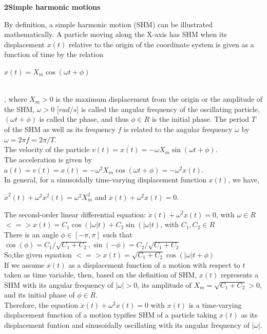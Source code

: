 \documentclass[a4paper,12pt,oneside]{report}
\newenvironment{tree}[4]{
\begin{list}{#1}{\parskip=0in \topsep=0in \itemsep=0in \parsep=0in \partopsep=0in \leftmargin=#2 \rightmargin=#3 \itemindent=#4 \listparindent=\itemindent}
}{\end{list}}
\newenvironment{ssection}[5]{
\phantom{#1}\textbf{#2\space#3}
\begin{tree}{#4}{0in}{0in}{#5}
}{\end{tree}}
\begin{document}
\begin{ssection}{\space}{2}{Simple harmonic motions}{\textbullet}{\parindent}
\item By definition, a simple harmonic motion (SHM) can be illustrated mathematically. A particle moving along the X-axis has SHM when its displacement $x(t)$ relative to the origin of the coordinate system is given as a function of time by the relation\\ \centerline{$x(t)=X_{m}\cos(\omega t+\phi)$}\\ \indent, where $X_{m}>0$ is the maximum displacement from the origin or the amplitude of the SHM, $\omega>0$ [$rad/s$] is called the angular frequency of the oscillating particle, $(\omega t+\phi)$ is called the phase, and thus $\phi\in R$ is the initial phase. The period $T$ of the SHM as well as its frequency $f$ is related to the angular frequency $\omega$ by $\omega=2\pi f=2\pi/T$.\\
\indent The velocity of the particle $v(t)=\dot{x(t)}=-\omega X_{m}\sin(\omega t+\phi)$.\\
\indent The acceleration is given by $a(t)=\dot{v(t)}=\ddot{x(t)}=-\omega^{2}X_{m}\cos(\omega t+\phi)=-\omega^{2}x(t)$. \\ \indent In general, for a sinusoidally time-varying displacement function $x(t)$, we have,\\ \centerline{$\dot{x}^{2}(t)+\omega^{2}x^{2}(t)=\omega^{2}X^{2}_{m}$ and $\ddot{x}(t)+\omega^{2}x(t)=0$.}
\item The second-order linear differential equation: $\ddot{x}(t)+\omega^{2}x(t)=0$, with $\omega\in R$\\ \indent $<=> x(t)=C_{1}\cos(|\omega|t)+C_{2}\sin(|\omega|t)$, with $C_{1}, C_{2} \in R$\\There is an angle $\phi \in [-\pi,\pi]$ such that $\cos(\phi)=C_{1}/\sqrt{C_{1}+C_{2}}, \sin(-\phi)=C_{2}/\sqrt{C_{1}+C_{2}}$\\So,the given equation $<=> x(t)=\sqrt{C_{1}+C_{2}}\cos(|\omega|t+\phi)$\\ \indent If we assume $x(t)$ as a displacement function of a motion with respect to $t$ taken as time variable, then, based on the definition of SHM, $x(t)$ represents a SHM with its angular frequency of $|\omega|>0$, its amplitude of $X_{m}=\sqrt{C_{1}+C_{2}}>0$, and its initial phase of $\phi\in R$.\\ \indent Therefore, the equation $\ddot{x}(t)+\omega^{2}x(t)=0$ with $x(t)$ is a time-varying displacement function of a motion typifies SHM of a particle taking $x(t)$ as its displacement funtion and sinusoidally oscillating with its angular frequency of $|\omega|$.

\end{ssection}
\end{document}
